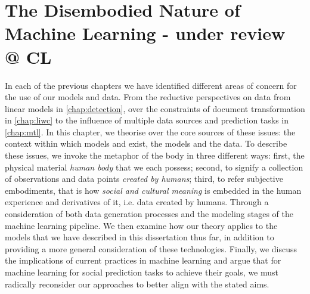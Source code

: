 \ifpdf
    \graphicspath{{Chapter8/Figs/Raster/}{Chapter8/Figs/PDF/}{Chapter8/Figs/}}
\else
    \graphicspath{{Chapter8/Figs/Vector/}{Chapter8/Figs/}}
\fi


\chapter{The Disembodied Nature of Machine Learning - under review @ CL}\label{chap:disembodied}


In each of the previous chapters we have identified different areas of concern for the use of our models and data. From the reductive perspectives on data from linear models in \autoref{chap:detection}, over the constraints of document transformation in \autoref{chap:liwc} to the influence of multiple data sources and prediction tasks in \autoref{chap:mtl}. In this chapter, we theorise over the core sources of these issues: the context within which models and exist, the models and the data.
To describe these issues, we invoke the metaphor of the body in three different ways: first, the physical material \textit{human body} that we each possess; second, to signify a collection of observations and data points \textit{created by humans}; third, to refer subjective embodiments, that is how \textit{social and cultural meaning} is embedded in the human experience and derivatives of it, i.e. data created by humans.
 Through a consideration of both data generation processes and the modeling stages of the machine learning pipeline. We then examine how our theory applies to the models that we have described in this dissertation thus far, in addition to providing a more general consideration of these technologies. Finally, we discuss the implications of current practices in machine learning and argue that for machine learning for social prediction tasks to achieve their goals, we must radically reconsider our approaches to better align with the stated aims.


